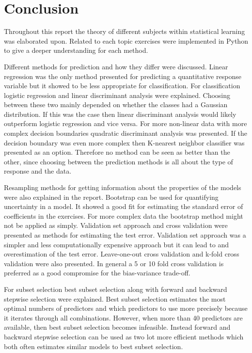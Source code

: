 \chapter{Conclusion}
\label{chp:conc}

Throughout this report the theory of different subjects within statistical learning was elaborated upon. Related to each topic exercises were implemented in Python to give a deeper understanding for each method. 

Different methods for prediction and how they differ were discussed. Linear regression was the only method presented for predicting a quantitative response variable but it showed to be less appropriate for classification. For classification logistic regression and linear discriminant analysis were explained. Choosing between these two mainly depended on whether the classes had a Gaussian distribution. If this was the case then linear discriminant analysis would likely outperform logistic regression and vice versa. For more non-linear data with more complex decision boundaries quadratic discriminant analysis was presented. If the decision boundary was even more complex then K-nearest neighbor classifier was presented as an option. Therefore no method can be seen as better than the other, since choosing between the prediction methods is all about the type of response and the data.

Resampling methods for getting information about the properties of the models were also explained in the report. Bootstrap can be used for quantifying uncertainty in a model. It showed a good fit for estimating the standard error of coefficients in the exercises. For more complex data the bootstrap method might not be applied as simply.
Validation set approach and cross validation were presented as methods for estimating the test error. Validation set approach was a simpler and less computationally expensive approach but it can lead to and overestimation of the test error. Leave-one-out cross validation and k-fold cross validation were also presented. In general a 5 or 10 fold cross validation is preferred as a good compromise for the bias-variance trade-off.

For subset selection best subset selection along with forward and backward stepwise selection were explained. Best subset selection estimates the most optimal numbers of predictors and which predictors to use more precisely because it iterates through all combinations. However, when more than 40 predictors are available, then best subset selection becomes infeasible. Instead forward and backward stepwise selection can be used as two lot more efficient methods which both often estimates similar models to best subset selection.

